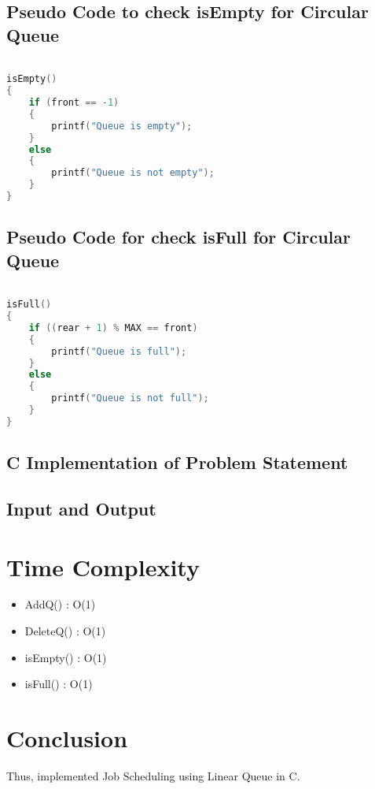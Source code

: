 \documentclass[11pt]{article}
\begin{document}
\subsection{Pseudo Code to check isEmpty for Circular Queue}

\begin{lstlisting}[language=C]

isEmpty()
{
	if (front == -1)
	{
		printf("Queue is empty");
	}
	else
	{
		printf("Queue is not empty");
	}
}

\end{lstlisting}

\subsection{Pseudo Code for check isFull for Circular Queue}

\begin{lstlisting}[language=C]

isFull()
{
	if ((rear + 1) % MAX == front)
	{
		printf("Queue is full");
	}
	else
	{
		printf("Queue is not full");
	}
}

\end{lstlisting}


\subsection{C Implementation of Problem Statement}



\subsection{Input and Output}


\section{Time Complexity}
\begin{itemize}
	\item AddQ() : O(1)
	\item DeleteQ() : O(1)
	\item isEmpty() : O(1)
	\item isFull() : O(1)
\end{itemize}

\section{Conclusion}
Thus, implemented Job Scheduling using Linear Queue in C.
\end{document}
